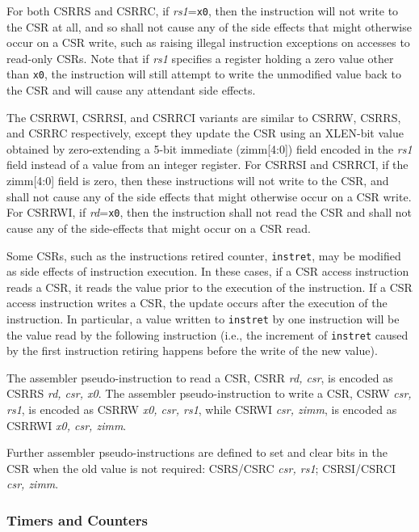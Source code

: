 For both CSRRS and CSRRC, if {\em rs1}={\tt x0}, then the instruction
will not write to the CSR at all, and so shall not cause any of the
side effects that might otherwise occur on a CSR write, such as
raising illegal instruction exceptions on accesses to read-only CSRs.
Note that if {\em rs1} specifies a register holding a zero value other
than {\tt x0}, the instruction will still attempt to write the
unmodified value back to the CSR and will cause any attendant side effects.

The CSRRWI, CSRRSI, and CSRRCI variants are similar to CSRRW, CSRRS,
and CSRRC respectively, except they update the CSR using an XLEN-bit
value obtained by zero-extending a 5-bit immediate (zimm[4:0]) field
encoded in the {\em rs1} field instead of a value from an integer
register.  For CSRRSI and CSRRCI, if the zimm[4:0] field is zero, then
these instructions will not write to the CSR, and shall not cause any
of the side effects that might otherwise occur on a CSR write.  For
CSRRWI, if {\em rd}={\tt x0}, then the instruction shall not read the
CSR and shall not cause any of the side-effects that might occur on a
CSR read.

Some CSRs, such as the instructions retired counter, {\tt instret}, may be
modified as side effects of instruction execution.  In these cases, if a CSR
access instruction reads a CSR, it reads the value prior to the execution of
the instruction.  If a CSR access instruction writes a CSR, the update occurs
after the execution of the instruction.  In particular, a value written to
{\tt instret} by one instruction will be the value read by the following
instruction (i.e., the increment of {\tt instret} caused by the first
instruction retiring happens before the write of the new value).

The assembler pseudo-instruction to read a CSR, CSRR {\em rd, csr}, is
encoded as CSRRS {\em rd, csr, x0}.  The assembler pseudo-instruction
to write a CSR, CSRW {\em csr, rs1}, is encoded as CSRRW {\em x0, csr,
  rs1}, while CSRWI {\em csr, zimm}, is encoded as CSRRWI {\em x0,
  csr, zimm}.

Further assembler pseudo-instructions are defined to set and clear
bits in the CSR when the old value is not required: CSRS/CSRC {\em
  csr, rs1}; CSRSI/CSRCI {\em csr, zimm}.

\subsubsection*{Timers and Counters}

